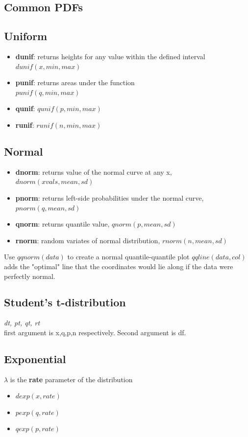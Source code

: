 \documentclass[openany]{book}
\begin{document}
\begin{flushleft}
\section{Common PDFs}
\subsection{Uniform}
\begin{itemize}
\item \textbf{dunif}: returns heights for any value within the defined interval \\ 
$dunif(x,min,max)$
\item \textbf{punif}: returns areas under the function\\
 $punif(q,min,max)$
\item \textbf{qunif}: $qunif(p,min,max)$
\item \textbf{runif}: $runif(n,min,max)$
\end{itemize}
\subsection{Normal}
\begin{itemize}
\item \textbf{dnorm}: returns value of the normal curve at any x, $dnorm(xvals,mean,sd)$
\item \textbf{pnorm}: returns left-side probabilities under the normal curve, $pnorm(q,mean,sd)$
\item \textbf{qnorm}: returns quantile value, $qnorm(p,mean,sd)$
\item \textbf{rnorm}: random variates of normal distribution, $rnorm(n,mean,sd)$
\end{itemize}
Use $qqnorm(data)$ to create a normal quantile-quantile plot \medbreak
$qqline(data,col)$ adds the "optimal" line that the coordinates would lie along if the data were perfectly normal.
\subsection{Student's t-distribution}
\textit{dt, pt, qt, rt} \\
first argument is x,q,p,n respectively. Second argument is df.
\subsection{Exponential}
$\lambda$ is the \textbf{rate} parameter of the distribution \medbreak
\begin{itemize}
\item $dexp(x,rate)$
\item $pexp(q,rate)$
\item $qexp(p,rate)$
\end{itemize}

\end{flushleft}
\end{document}
